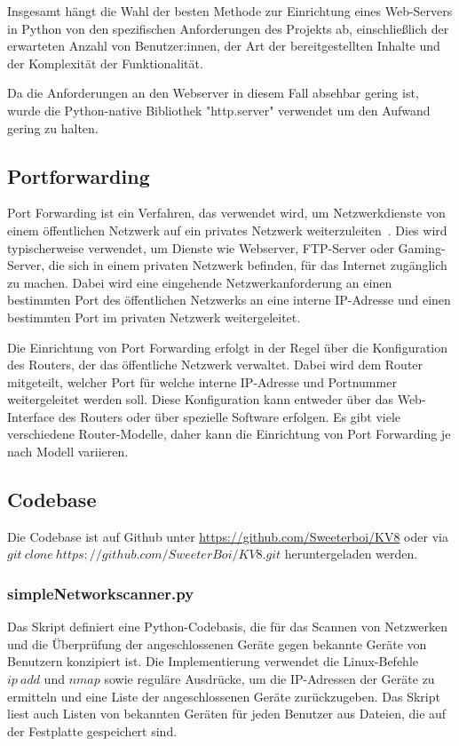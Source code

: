 \documentclass[12pt]{article}
\begin{document}
Insgesamt hängt die Wahl der besten Methode zur Einrichtung eines Web-Servers in Python von den spezifischen Anforderungen des Projekts ab, einschließlich der erwarteten Anzahl von Benutzer:innen, der Art der bereitgestellten Inhalte und der Komplexität der Funktionalität.

Da die Anforderungen an den Webserver in diesem Fall absehbar gering ist, wurde die Python-native Bibliothek "http.server" verwendet um den Aufwand gering zu halten.

\subsection{Portforwarding}

Port Forwarding ist ein Verfahren, das verwendet wird, um Netzwerkdienste von einem öffentlichen Netzwerk auf ein privates Netzwerk weiterzuleiten~\cite{portforward}. Dies wird typischerweise verwendet, um Dienste wie Webserver, FTP-Server oder Gaming-Server, die sich in einem privaten Netzwerk befinden, für das Internet zugänglich zu machen. Dabei wird eine eingehende Netzwerkanforderung an einen bestimmten Port des öffentlichen Netzwerks an eine interne IP-Adresse und einen bestimmten Port im privaten Netzwerk weitergeleitet.

Die Einrichtung von Port Forwarding erfolgt in der Regel über die Konfiguration des Routers, der das öffentliche Netzwerk verwaltet. Dabei wird dem Router mitgeteilt, welcher Port für welche interne IP-Adresse und Portnummer weitergeleitet werden soll. Diese Konfiguration kann entweder über das Web-Interface des Routers oder über spezielle Software erfolgen. Es gibt viele verschiedene Router-Modelle, daher kann die Einrichtung von Port Forwarding je nach Modell variieren.


\subsection{Codebase}

Die Codebase ist auf Github unter \url{https://github.com/Sweeterboi/KV8} oder via $git~clone~https://github.com/SweeterBoi/KV8.git$ heruntergeladen werden.

\subsubsection{simpleNetworkscanner.py}
Das Skript definiert eine Python-Codebasis, die für das Scannen von Netzwerken und die Überprüfung der angeschlossenen Geräte gegen bekannte Geräte von Benutzern konzipiert ist. Die Implementierung verwendet die Linux-Befehle $ip~add$ und $nmap$ sowie reguläre Ausdrücke, um die IP-Adressen der Geräte zu ermitteln und eine Liste der angeschlossenen Geräte zurückzugeben. Das Skript liest auch Listen von bekannten Geräten für jeden Benutzer aus Dateien, die auf der Festplatte gespeichert sind.
\end{document}
